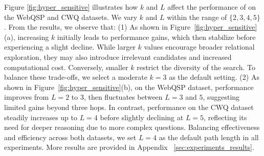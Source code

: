 Figure \ref{fig:hyper_sensitive} illustrates how $k$ and  $L$ affect the performance of \method{} on the WebQSP and CWQ datasets. We vary $k$ and $L$ within the range of  $\{2, 3, 4, 5\}$. From the results, we observe that: (1) As shown in Figure~\ref{fig:hyper_sensitive}(a), increasing $k$ initially leads to performance gains, which then stabilize before experiencing a slight decline. While larger $k$ values encourage broader relational exploration, they may also introduce irrelevant candidates and increased computational cost. Conversely, smaller $k$ restrict the diversity of the search. To balance these trade-offs, we select a moderate $k=3$ as the default setting. (2) As shown in Figure~\ref{fig:hyper_sensitive}(b), on the WebQSP dataset, performance improves from $L=2$ to $3$, then fluctuates between $L=3$ and $5$, suggesting limited gains beyond three hops. In contrast, performance on the CWQ dataset steadily increases up to $L=4$ before slightly declining at $L=5$, reflecting its need for deeper reasoning due to more complex questions. Balancing effectiveness and efficiency across both datasets, we set $L=4$ as the default path length in all experiments. 
More results are provided in Appendix ~\ref{sec:experiments_results}.





